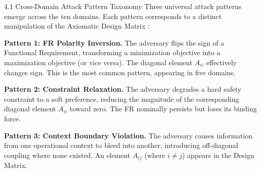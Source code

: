\documentclass[
  ignorenonframetext,
]{beamer}
\newcounter{none} %
\begin{document}
\begin{frame}[allowframebreaks]{4.1 Cross-Domain Attack Pattern
Taxonomy}
\protect{}\label{sec:attack_patterns}
Three universal attack patterns emerge across the ten domains. Each
pattern corresponds to a distinct manipulation of the Axiomatic Design
Matrix \cite{suh2001axiomatic}:

\textbf{Pattern 1: FR Polarity Inversion.} The adversary flips the sign
of a Functional Requirement, transforming a minimization objective into
a maximization objective (or vice versa). The diagonal element
\(A_{ii}\) effectively changes sign. This is the most common pattern,
appearing in five domains.

\textbf{Pattern 2: Constraint Relaxation.} The adversary degrades a hard
safety constraint to a soft preference, reducing the magnitude of the
corresponding diagonal element \(A_{ii}\) toward zero. The FR nominally
persists but loses its binding force.

\textbf{Pattern 3: Context Boundary Violation.} The adversary causes
information from one operational context to bleed into another,
introducing off-diagonal coupling where none existed. An element
\(A_{ij}\) (where \(i \neq j\)) appears in the Design Matrix.


\end{frame}
\end{document}
